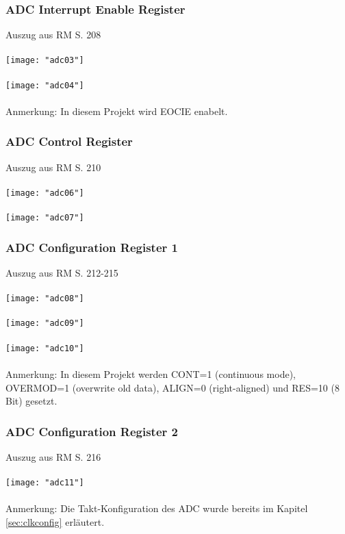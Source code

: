 \documentclass[11pt]{report}
\begin{document}
			\subsubsection{ADC Interrupt Enable Register}
				Auszug aus RM S. 208\\
				\\\texttt{[image: "adc03"]}\\
				\\\texttt{[image: "adc04"]}\\
				\\Anmerkung: In diesem Projekt wird EOCIE enabelt.
			\subsubsection{ADC Control Register}
				Auszug aus RM S. 210\\
				\\\texttt{[image: "adc06"]}\\
				\\\texttt{[image: "adc07"]}\\
			\subsubsection{ADC Configuration Register 1}
				Auszug aus RM S. 212-215\\
				\\\texttt{[image: "adc08"]}\\
				\\\texttt{[image: "adc09"]}\\
				\\\texttt{[image: "adc10"]}\\
				\\Anmerkung: In diesem Projekt werden CONT=1 (continuous mode), OVERMOD=1 (overwrite old data), ALIGN=0 (right-aligned) und RES=10 (8 Bit) gesetzt.
			\subsubsection{ADC Configuration Register 2}
				Auszug aus RM S. 216\\
				\\\texttt{[image: "adc11"]}\\
				\\Anmerkung: Die Takt-Konfiguration des ADC wurde bereits im Kapitel \ref{sec:clkconfig} erläutert.
\end{document}
